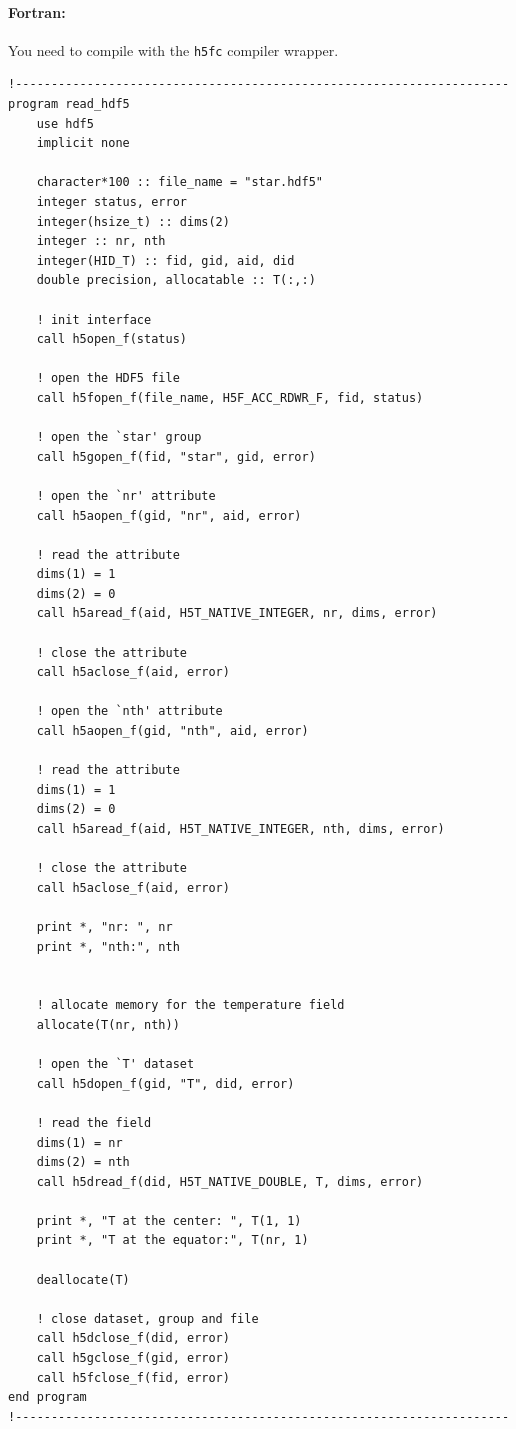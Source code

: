 \paragraph{Fortran:}
You need to compile with the \texttt{h5fc} compiler wrapper. 
\begin{verbatim}
!---------------------------------------------------------------------
program read_hdf5
    use hdf5
    implicit none

    character*100 :: file_name = "star.hdf5"
    integer status, error
    integer(hsize_t) :: dims(2)
    integer :: nr, nth
    integer(HID_T) :: fid, gid, aid, did
    double precision, allocatable :: T(:,:)

    ! init interface
    call h5open_f(status)

    ! open the HDF5 file
    call h5fopen_f(file_name, H5F_ACC_RDWR_F, fid, status)

    ! open the `star' group
    call h5gopen_f(fid, "star", gid, error)

    ! open the `nr' attribute
    call h5aopen_f(gid, "nr", aid, error)

    ! read the attribute
    dims(1) = 1
    dims(2) = 0
    call h5aread_f(aid, H5T_NATIVE_INTEGER, nr, dims, error)

    ! close the attribute
    call h5aclose_f(aid, error)

    ! open the `nth' attribute
    call h5aopen_f(gid, "nth", aid, error)

    ! read the attribute
    dims(1) = 1
    dims(2) = 0
    call h5aread_f(aid, H5T_NATIVE_INTEGER, nth, dims, error)

    ! close the attribute
    call h5aclose_f(aid, error)

    print *, "nr: ", nr
    print *, "nth:", nth


    ! allocate memory for the temperature field
    allocate(T(nr, nth))

    ! open the `T' dataset
    call h5dopen_f(gid, "T", did, error)

    ! read the field
    dims(1) = nr
    dims(2) = nth
    call h5dread_f(did, H5T_NATIVE_DOUBLE, T, dims, error)

    print *, "T at the center: ", T(1, 1)
    print *, "T at the equator:", T(nr, 1)

    deallocate(T)

    ! close dataset, group and file
    call h5dclose_f(did, error)
    call h5gclose_f(gid, error)
    call h5fclose_f(fid, error)
end program
!---------------------------------------------------------------------
\end{verbatim}

